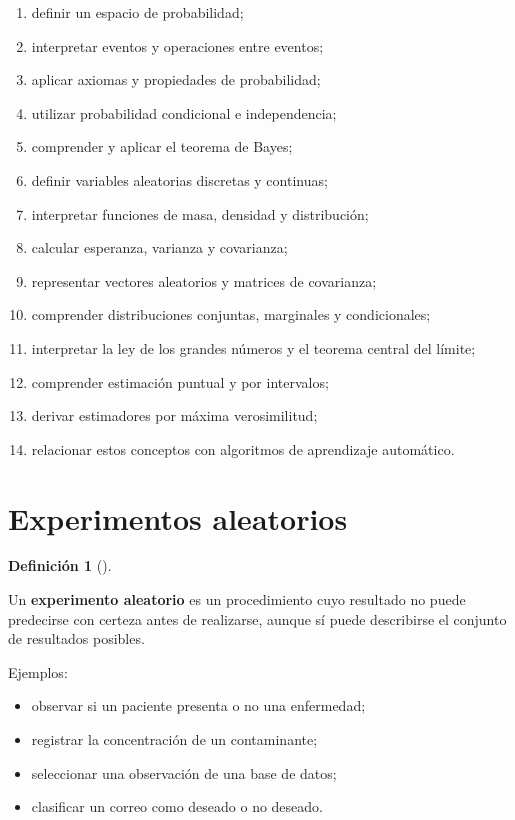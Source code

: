 \documentclass[
  spanish,
  11pt,
  letterpaper,
  DIV=11,
  numbers=noendperiod]{scrreprt}
\providecommand{\tightlist}{%
  \setlength{\itemsep}{0pt}\setlength{\parskip}{0pt}}
\theoremstyle{definition}
\newtheorem{definition}{Definición}[chapter]
\theoremstyle{plain}
\theoremstyle{definition}
\theoremstyle{remark}
\begin{document}
\begin{enumerate}
\def\labelenumi{\arabic{enumi}.}
\tightlist
\item
  definir un espacio de probabilidad;
\item
  interpretar eventos y operaciones entre eventos;
\item
  aplicar axiomas y propiedades de probabilidad;
\item
  utilizar probabilidad condicional e independencia;
\item
  comprender y aplicar el teorema de Bayes;
\item
  definir variables aleatorias discretas y continuas;
\item
  interpretar funciones de masa, densidad y distribución;
\item
  calcular esperanza, varianza y covarianza;
\item
  representar vectores aleatorios y matrices de covarianza;
\item
  comprender distribuciones conjuntas, marginales y condicionales;
\item
  interpretar la ley de los grandes números y el teorema central del
  límite;
\item
  comprender estimación puntual y por intervalos;
\item
  derivar estimadores por máxima verosimilitud;
\item
  relacionar estos conceptos con algoritmos de aprendizaje automático.
\end{enumerate}

\section{Experimentos aleatorios}\label{experimentos-aleatorios}

\begin{definition}[]\protect\hypertarget{def-experimento-aleatorio}{}\label{def-experimento-aleatorio}

Un \textbf{experimento aleatorio} es un procedimiento cuyo resultado no
puede predecirse con certeza antes de realizarse, aunque sí puede
describirse el conjunto de resultados posibles.

\end{definition}

Ejemplos:

\begin{itemize}
\tightlist
\item
  observar si un paciente presenta o no una enfermedad;
\item
  registrar la concentración de un contaminante;
\item
  seleccionar una observación de una base de datos;
\item
  clasificar un correo como deseado o no deseado.
\end{itemize}
\end{document}

